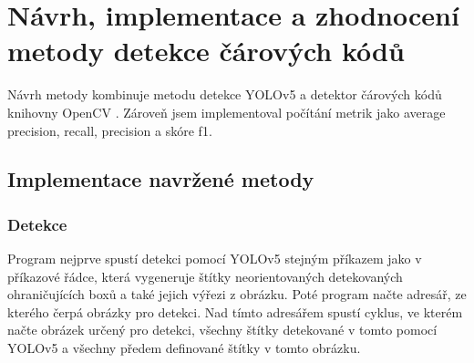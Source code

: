 

\chapter{Návrh, implementace a zhodnocení metody detekce čárových kódů} 
\label{implementation}

Návrh metody kombinuje metodu detekce YOLOv5 \cite{yolov5_github} a detektor čárových kódů knihovny OpenCV \cite{opencv_barcode}. Zároveň jsem implementoval počítání metrik jako average precision, recall, precision a skóre f1. 
\section{Implementace navržené metody}
\subsection*{Detekce}
Program nejprve spustí detekci pomocí YOLOv5 stejným příkazem jako v příkazové řádce, která vygeneruje štítky neorientovaných detekovaných ohraničujících boxů a také jejich výřezi z obrázku. Poté program načte adresář, ze kterého čerpá obrázky pro detekci. Nad tímto adresářem spustí cyklus, ve kterém načte obrázek určený pro detekci, všechny štítky detekované v tomto pomocí YOLOv5 a všechny předem definované štítky v tomto obrázku.
